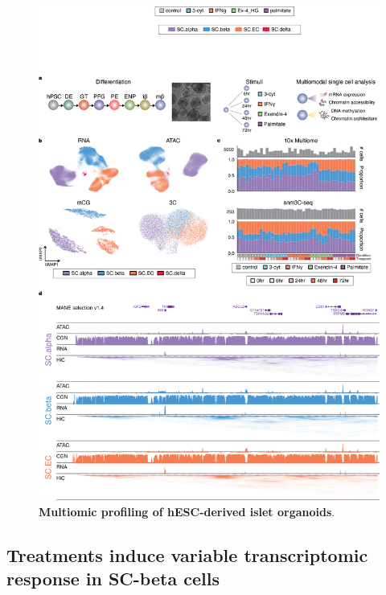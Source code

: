 \clearpage

\begin{figure}[!htbp]
    \centering
    \includegraphics[height=0.8\textheight, keepaspectratio]{3_figures-and-files/Fig1.png}
    \caption[Multiomic profiling of hESC-derived islet organoids]{\textbf{Multiomic profiling of hESC-derived islet organoids}.}
    \label{fig:3 Figure 1}
\end{figure}

\clearpage


\subsection{Treatments induce variable transcriptomic response in SC-beta cells}

